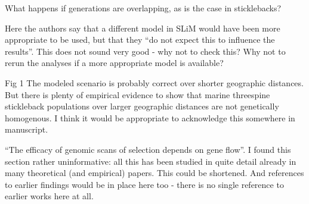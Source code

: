 
\begin{point}{\revref}
What happens if generations are overlapping, as is the case in sticklebacks?
\end{point}


\begin{point}{\revref}
Here the authors say that a different model in SLiM would have been more appropriate to be used, but that they ``do not expect this to influence the results''. This does not sound very good - why not to check this? Why not to rerun the analyses if a more appropriate model is available?
\end{point}


\begin{point}{Fig 1}
The modeled scenario is probably correct over shorter geographic distances. But there is plenty of empirical evidence to show that marine threespine stickleback populations over larger geographic distances are not genetically homogenous. I think it would be appropriate to acknowledge this somewhere in manuscript.
\end{point}


\begin{point}{\revref}
``The efficacy of genomic scans of selection depends on gene flow''. I found this section rather uninformative: all this has been studied in quite detail already in many theoretical (and empirical) papers. This could be shortened. And references to earlier findings would be in place here too - there is no single reference to earlier works here at all.
\end{point}

